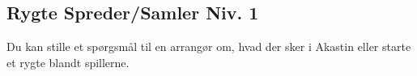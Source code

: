 \subsection{Rygte Spreder/Samler Niv. 1}
Du kan stille et spørgsmål til en arrangør om, hvad der sker i Akastin eller starte et rygte blandt spillerne.